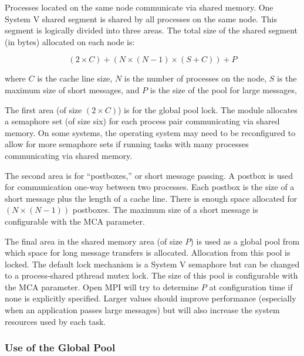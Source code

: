 Processes located on the same node communicate via shared memory.  One
System V shared segment is shared by all processes on the same node.
This segment is logically divided into three areas.  The total size of
the shared segment (in bytes) allocated on each node is:

\[ 
(2 \times C) + (N \times (N-1) \times (S + C)) + P
\]

where $C$ is the cache line size, $N$ is the number of processes on
the node, $S$ is the maximum size of short messages, and $P$ is the
size of the pool for large messages,

The first area (of size $(2 \times C)$) is for the global pool lock.
The  module allocates a semaphore set (of size six) for each
process pair communicating via shared memory.  On some systems, the
operating system may need to be reconfigured to allow for more
semaphore sets if running tasks with many processes communicating via
shared memory.

The second area is for ``postboxes,'' or short message passing.  A
postbox is used for communication one-way between two processes.  Each
postbox is the size of a short message plus the length of a cache
line.  There is enough space allocated for $(N \times (N-1))$
postboxes.  The maximum size of a short message is configurable with
the  MCA parameter.



The final area in the shared memory area (of size $P$) is used as a
global pool from which space for long message transfers is allocated.
Allocation from this pool is locked.  The default lock mechanism is a
System V semaphore but can be changed to a process-shared pthread
mutex lock.  The size of this pool is configurable with the
 MCA parameter.  Open MPI will
try to determine $P$ at configuration time if none is explicitly
specified.  Larger values should improve performance (especially when
an application passes large messages) but will also increase the
system resources used by each task.


\subsubsection{Use of the Global Pool}
  
